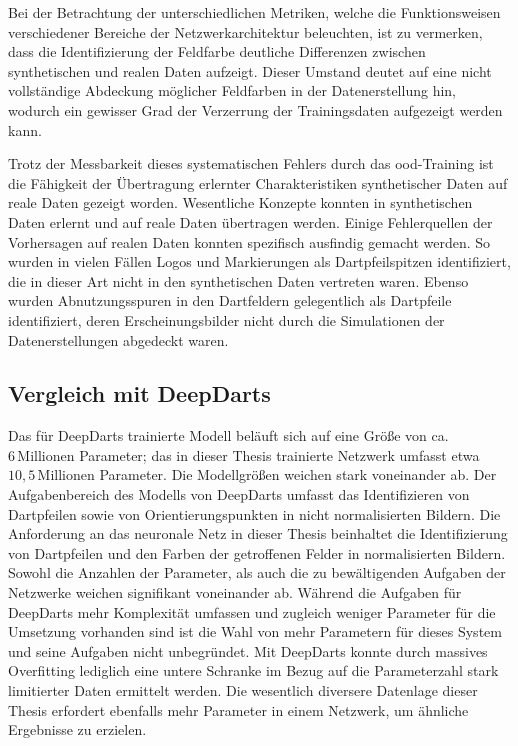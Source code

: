 Bei der Betrachtung der unterschiedlichen Metriken, welche die Funktionsweisen verschiedener Bereiche der Netzwerkarchitektur beleuchten, ist zu vermerken, dass die Identifizierung der Feldfarbe deutliche Differenzen zwischen synthetischen und realen Daten aufzeigt. Dieser Umstand deutet auf eine nicht vollständige Abdeckung möglicher Feldfarben in der Datenerstellung hin, wodurch ein gewisser Grad der Verzerrung der Trainingsdaten aufgezeigt werden kann.

Trotz der Messbarkeit dieses systematischen Fehlers durch das \ac{ood}-Training ist die Fähigkeit der Übertragung erlernter Charakteristiken synthetischer Daten auf reale Daten gezeigt worden. Wesentliche Konzepte konnten in synthetischen Daten erlernt und auf reale Daten übertragen werden. Einige Fehlerquellen der Vorhersagen auf realen Daten konnten spezifisch ausfindig gemacht werden. So wurden in vielen Fällen Logos und Markierungen als Dartpfeilspitzen identifiziert, die in dieser Art nicht in den synthetischen Daten vertreten waren. Ebenso wurden Abnutzungsspuren in den Dartfeldern gelegentlich als Dartpfeile identifiziert, deren Erscheinungsbilder nicht durch die Simulationen der Datenerstellungen abgedeckt waren.


\subsection{Vergleich mit DeepDarts}

Das für DeepDarts trainierte Modell beläuft sich auf eine Größe von ca. $6\,\text{Millionen}$ Parameter; das in dieser Thesis trainierte Netzwerk umfasst etwa $10,5\,\text{Millionen}$ Parameter. Die Modellgrößen weichen stark voneinander ab. Der Aufgabenbereich des Modells von DeepDarts umfasst das Identifizieren von Dartpfeilen sowie von Orientierungspunkten in nicht normalisierten Bildern. Die Anforderung an das neuronale Netz in dieser Thesis beinhaltet die Identifizierung von Dartpfeilen und den Farben der getroffenen Felder in normalisierten Bildern. Sowohl die Anzahlen der Parameter, als auch die zu bewältigenden Aufgaben der Netzwerke weichen signifikant voneinander ab. Während die Aufgaben für DeepDarts mehr Komplexität umfassen und zugleich weniger Parameter für die Umsetzung vorhanden sind ist die Wahl von mehr Parametern für dieses System und seine Aufgaben nicht unbegründet. Mit DeepDarts konnte durch massives Overfitting lediglich eine untere Schranke im Bezug auf die Parameterzahl stark limitierter Daten ermittelt werden. Die wesentlich diversere Datenlage dieser Thesis erfordert ebenfalls mehr Parameter in einem Netzwerk, um ähnliche Ergebnisse zu erzielen.


